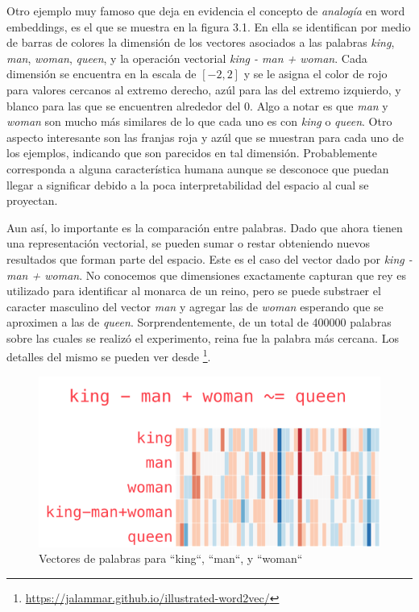 Otro ejemplo muy famoso que deja en evidencia el concepto de \emph{analogía} en
word embeddings, es el que se muestra en la figura 3.1. En ella se identifican
por medio de barras de colores la dimensión de los vectores asociados a las
palabras \emph{king}, \emph{man}, \emph{woman}, \emph{queen}, y la operación
vectorial \emph{king - man + woman}. Cada dimensión se encuentra en la escala de
$[-2, 2]$ y se le asigna el color de rojo para valores cercanos al extremo
derecho, azúl para las del extremo izquierdo, y blanco para las que se
encuentren alrededor del 0.  Algo a notar es que \emph{man} y \emph{woman} son
mucho más similares de lo que cada uno es con \emph{king} o \emph{queen}. Otro
aspecto interesante son las franjas roja y azúl que se muestran para cada uno de
los ejemplos, indicando que son parecidos en tal dimensión. Probablemente
corresponda a alguna característica humana aunque se desconoce que puedan llegar
a significar debido a la poca interpretabilidad del espacio al cual se proyectan.

Aun así, lo importante es la comparación entre palabras. Dado que ahora tienen
una representación vectorial, se pueden sumar o restar obteniendo nuevos
resultados que forman parte del espacio. Este es el caso del vector dado por
\emph{king - man + woman}. No conocemos que dimensiones exactamente capturan que
rey es utilizado para identificar al monarca de un reino, pero se puede
substraer el caracter masculino del vector \emph{man} y agregar las de
\emph{woman} esperando que se aproximen a las de \emph{queen}.
Sorprendentemente, de un total de 400000 palabras sobre las cuales se realizó el
experimento, reina fue la palabra más cercana. Los detalles del mismo se pueden
ver desde \footnote{\url{https://jalammar.github.io/illustrated-word2vec/}}.

\begin{figure}
    \centering
    \includegraphics[scale=0.68]{figures/king-analogy-viz.png}
    \caption{Vectores de palabras para ``king``, ``man``, y ``woman``}
\end{figure}

